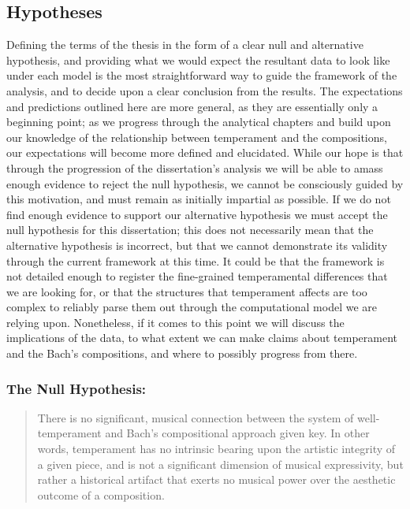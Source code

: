     \subsection{Hypotheses}\label{hypotheses}

Defining the terms of the thesis in the form of a clear null and
alternative hypothesis, and providing what we would expect the resultant
data to look like under each model is the most straightforward way to
guide the framework of the analysis, and to decide upon a clear
conclusion from the results. The expectations and predictions outlined
here are more general, as they are essentially only a beginning point;
as we progress through the analytical chapters and build upon our
knowledge of the relationship between temperament and the compositions,
our expectations will become more defined and elucidated. While our hope
is that through the progression of the dissertation's analysis we will
be able to amass enough evidence to reject the null hypothesis, we
cannot be consciously guided by this motivation, and must remain as
initially impartial as possible. If we do not find enough evidence to
support our alternative hypothesis we must accept the null hypothesis
for this dissertation; this does not necessarily mean that the
alternative hypothesis is incorrect, but that we cannot demonstrate its
validity through the current framework at this time. It could be that
the framework is not detailed enough to register the fine-grained
temperamental differences that we are looking for, or that the
structures that temperament affects are too complex to reliably parse
them out through the computational model we are relying upon.
Nonetheless, if it comes to this point we will discuss the implications
of the data, to what extent we can make claims about temperament and the
Bach's compositions, and where to possibly progress from there.

\subsubsection{The Null Hypothesis:}\label{the-null-hypothesis}

\begin{quote}
There is no significant, musical connection between the system of
well-temperament and Bach's compositional approach given key. In other
words, temperament has no intrinsic bearing upon the artistic integrity
of a given piece, and is not a significant dimension of musical
expressivity, but rather a historical artifact that exerts no musical
power over the aesthetic outcome of a composition.
\end{quote}

